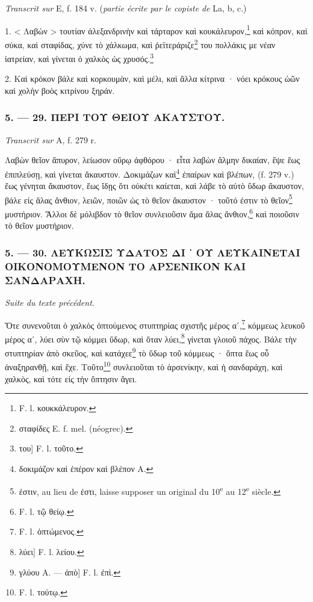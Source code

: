\documentclass[a4paper, 11pt, oneside, polutonikogreek, french]{article}
\begin{document}
\emph{Transcrit sur} E, f. 184 v. (\emph{partie écrite par le copiste de} La, b, c.)

\bigskip

1. < Λαβὼν > τουτίαν ἀλεξανδρινὴν καὶ τάρταρον καὶ κουκάλευρον,\footnote{F. l. κουκκάλευρον.} καὶ κόπρον, καὶ σύκα, καὶ σταφίδας, χύνε τὸ χάλκωμα, καὶ ῥεϊτεράριζε\footnote{σταφίδες E. f. mel. (néogrec).} του πολλάκις με νέαν ἰατρείαν, καὶ γίνεται ὁ χαλκὸς ὡς χρυσός.\footnote{του] F. l. τοῦτο.}

2. Καὶ κρόκον βάλε καὶ κορκουμὰν, καὶ μέλι, καὶ ἄλλα κίτρινα · νόει κρόκους ὠῶν καὶ χολὴν βοὸς κιτρίνου ξηράν.

\bigskip
\centerline{\EightStarTaper}
\centerline{\EightStarTaper\EightStarTaper}
\bigskip

\subsubsection{5. --- 29. ΠΕΡΙ ΤΟΥ ΘΕΙΟΥ ΑΚΑΥΣΤΟΥ.}

\emph{Transcrit sur} A, f. 279 r.

\bigskip

Λαβὼν θεῖον ἄπυρον, λείωσον οὔρῳ ἀφθόρου · εἶτα λαβὼν ἅλμην δικαίαν, ἕψε ἕως ἐπιπλεύσῃ, καὶ γίνεται ἄκαυστον. Δοκιμάζων καὶ\footnote{δοκιμάζον καὶ ἐπέρον καὶ βλέπον A.} ἐπαίρων καὶ βλέπων, (f. 279 v.) ἕως γένηται ἄκαυστον, ἕως ἴδῃς ὅτι οὐκέτι καίεται, καὶ λάβε τὸ αὐτὸ ὕδωρ ἄκαυστον, βάλε εἰς ἅλας ἄνθιον, λειῶν, ποιῶν ὡς τὸ θεῖον ἄκαυστον · τοῦτό ἐστιν τὸ θεῖον\footnote{ἐστιν, au lieu de ἐστι, laisse supposer un original du 10\textsuperscript{e} au 12\textsuperscript{e} siècle.} μυστήριον. Ἄλλοι δὲ μόλιβδον τὸ θεῖον συνλειοῦσιν ἅμα ἅλας ἄνθιον,\footnote{F. l. τῷ θείῳ.} καὶ ποιοῦσιν τὸ θεῖον μυστήριον.

\bigskip
\centerline{\EightStarTaper}
\centerline{\EightStarTaper\EightStarTaper}
\bigskip

\subsubsection{5. --- 30. ΛΕΥΚΩΣΙΣ ΥΔΑΤΟΣ ΔΙ ᾽ ΟΥ ΛΕΥΚΑΙΝΕΤΑΙ ΟΙΚΟΝΟΜΟΥΜΕΝΟΝ ΤΟ ΑΡΣΕΝΙΚΟΝ ΚΑΙ ΣΑΝΔΑΡΑΧΗ.}

\emph{Suite du texte précédent.}

\bigskip

Ὅτε συνενοῦται ὁ χαλκὸς ὀπτούμενος στυπτηρίας σχιστῆς μέρος αʹ,\footnote{F. l. ὀπτώμενος.} κόμμεως λευκοῦ μέρος αʹ, λύει σὺν τῷ κόμμει ὕδωρ, καὶ ὅταν λύει,\footnote{λύει] F. l. λείου.} γίνεται γλοιοῦ πάχος. Βάλε τὴν στυπτηρίαν ἀπὸ σκεῦος, καὶ κατάχεε\footnote{γλύου A. --- ἀπὸ] F. l. ἐπὶ.} τὸ ὕδωρ τοῦ κόμμεως · ὄπτα ἕως οὗ ἀναξηρανθῇ, καὶ ἔχε. Τοῦτο\footnote{F. l. τούτῳ.} συνλειοῦται τὸ ἀρσενίκην, καὶ ἡ σανδαράχη, καὶ χαλκὸς, καὶ τότε εἰς τὴν ὄπτησιν ἄγει.
\end{document}
